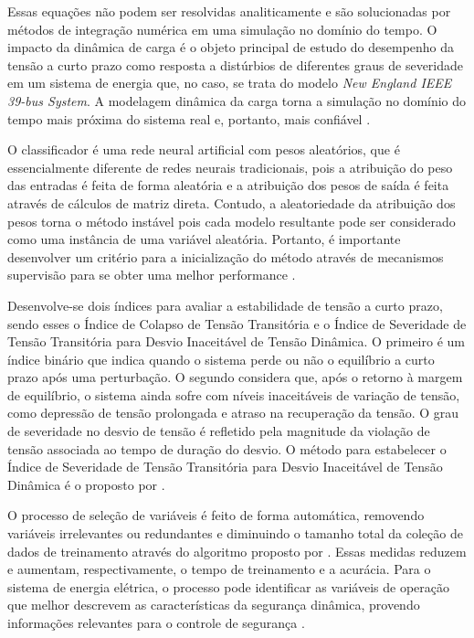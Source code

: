 \documentclass[12pt,oneside,a4paper,chapter=TITLE,section=TITLE,sumario=tradicional,english,brazil]{abntex2}
\begin{document}
Essas equações não podem ser resolvidas analiticamente e são solucionadas por métodos de integração numérica em uma simulação no domínio do tempo. O impacto da dinâmica de carga é o objeto principal de estudo do desempenho da tensão a curto prazo como resposta a distúrbios de diferentes graus de severidade em um sistema de energia que, no caso, se trata do modelo \textit{New England IEEE 39-bus System}. A modelagem dinâmica da carga torna a simulação no domínio do tempo mais próxima do sistema real e, portanto, mais confiável \cite{xu2010}.\par 
O classificador é uma rede neural artificial com pesos aleatórios, que é essencialmente diferente de redes neurais tradicionais, pois a atribuição do peso das entradas é feita de forma aleatória e a atribuição dos pesos de saída é feita através de cálculos de matriz direta. Contudo, a aleatoriedade da atribuição dos pesos torna o método instável pois cada modelo resultante pode ser considerado como uma instância de uma variável aleatória. Portanto, é importante desenvolver um critério para a inicialização do método através de mecanismos supervisão para se obter uma melhor performance \cite{schmidt1992}.\par
Desenvolve-se dois índices para avaliar a estabilidade de tensão a curto prazo, sendo esses o Índice de Colapso de Tensão Transitória e o Índice de Severidade de Tensão Transitória para Desvio Inaceitável de Tensão Dinâmica. O primeiro é um índice binário que indica quando o sistema perde ou não o equilíbrio a curto prazo após uma perturbação. O segundo considera que, após o retorno à margem de equilíbrio, o sistema ainda sofre com níveis inaceitáveis de variação de tensão, como depressão de tensão prolongada e atraso na recuperação da tensão. O grau de severidade no desvio de tensão é refletido pela magnitude da violação de tensão associada ao tempo de duração do desvio. O método para estabelecer o Índice de Severidade de Tensão Transitória para Desvio Inaceitável de Tensão Dinâmica é o proposto por \textcite{schmidt1992}.\par 
O processo de seleção de variáveis é feito de forma automática, removendo variáveis irrelevantes ou redundantes e diminuindo o tamanho total da coleção de dados de treinamento através do algoritmo proposto por \textcite{xu2011}. Essas medidas reduzem e aumentam, respectivamente, o tempo de treinamento e a acurácia. Para o sistema de energia elétrica, o processo pode identificar as variáveis de operação que melhor descrevem as características da segurança dinâmica, provendo informações relevantes para o controle de segurança \cite{xu2011}.\par
\end{document}
